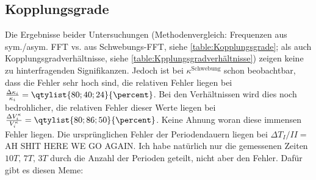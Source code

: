 \subsection*{Kopplungsgrade}
Die Ergebnisse beider Untersuchungen (Methodenvergleich: Frequenzen aus sym./asym. FFT vs. aus Schwebungs-FFT, siehe \cref{table:Kopplungsgrade}; als auch Kopplungsgradverhältnisse, siehe \cref{table:Kpplungsgradverhältnisse}) zeigen keine zu hinterfragenden Signifikanzen. Jedoch ist bei \(\kappa^\mathrm{Schwebung}\) schon beobachtbar, dass die Fehler sehr hoch sind, die relativen Fehler liegen bei \(\frac{\Delta\kappa_i}{\kappa_i}=\qtylist{80;40;24}{\percent}\). Bei den Verhältnissen wird dies noch bedrohlicher, die relativen Fehler dieser Werte liegen bei \(\frac{\Delta V^\kappa_i}{V^\kappa_i} =\qtylist{80;86;50}{\percent}\). Keine Ahnung woran diese immensen Fehler liegen.
Die ursprünglichen Fehler der Periodendauern liegen bei \(\Delta T_I/{II}=\qty{}{}\) AH SHIT HERE WE GO AGAIN.
Ich habe natürlich nur die gemessenen Zeiten \(10T,\,7T,\,3T\) durch die Anzahl der Perioden geteilt, nicht aber den Fehler. 
Dafür gibt es diesen Meme:

